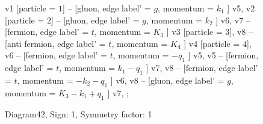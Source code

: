 \documentclass{revtex4}
\begin{document}
\begin{figure}[!htb]
\begin{center}
{    %
v1 [particle = \(1\)] -- [gluon, edge label' = \(g\), momentum = \(k_{1}\) ] v5, 
v2 [particle = \(2\)] -- [gluon, edge label' = \(g\), momentum = \(k_{2}\) ] v6, 
v7 -- [fermion, edge label' = \(t\), momentum = \(K_{3}\) ] v3 [particle = \(3\)], 
v8 -- [anti fermion, edge label' = \(\overline{t}\), momentum = \(K_{4}\) ] v4 [particle = \(4\)], 
v6 -- [fermion, edge label' = \(t\), momentum = \(-q_{1}\) ] v5, 
v5 -- [fermion, edge label' = \(t\), momentum = \(k_{1} - q_{1}\) ] v7, 
v8 -- [fermion, edge label' = \(t\), momentum = \(-k_{2} - q_{1}\) ] v6, 
v8 -- [gluon, edge label' = \(g\), momentum = \(K_{3} - k_{1} + q_{1}\) ] v7, 
};
\end{center}
\caption{Diagram42, Sign: 1, Symmetry factor: 1}
\end{figure}
\newpage
\end{document}
